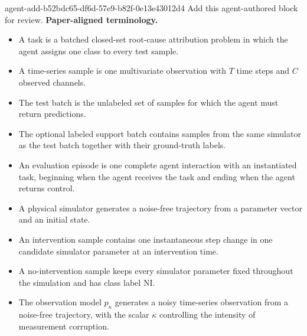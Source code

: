 \documentclass[11pt]{article}
\begin{document}
\label{docstart:terminology_common_utilities}

\agentProposedEdit
  {agent-add-b52bdc65-df6d-57e9-b82f-0e13e43012d4}
  {Add this agent-authored block for review.}
  {}
  {\textbf{Paper-aligned terminology.}}
\begin{itemize}
\item A \name{} task is a batched closed-set root-cause attribution problem in which the agent assigns one class to every test sample.
\item A time-series sample is one multivariate observation with \(T\) time steps and \(C\) observed channels.
\item The test batch is the unlabeled set of samples for which the agent must return predictions.
\item The optional labeled support batch contains samples from the same simulator as the test batch together with their ground-truth labels.
\item An evaluation episode is one complete agent interaction with an instantiated task, beginning when the agent receives the task and ending when the agent returns control.
\item A physical simulator generates a noise-free trajectory from a parameter vector and an initial state.
\item An intervention sample contains one instantaneous step change in one candidate simulator parameter at an intervention time.
\item A no-intervention sample keeps every simulator parameter fixed throughout the simulation and has class label \(\mathrm{NI}\).
\item The observation model \(p_{\kappa}\) generates a noisy time-series observation from a noise-free trajectory, with the scalar \(\kappa\) controlling the intensity of measurement corruption.
\end{itemize}
\end{document}
